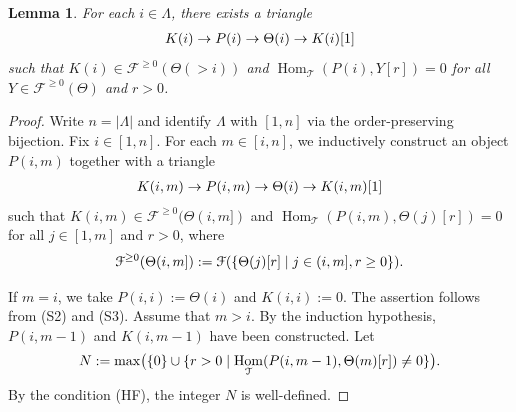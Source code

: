 \documentclass[a4paper,reqno,11pt]{amsart}
\numberwithin{equation}{section}
\newtheorem{lemma}[theorem]{Lemma}
\theoremstyle{definition}
\newcommand{\F}{\mathcal{F}}
\newcommand{\T}{\mathcal{T}}
\newcommand{\bte}{\Theta}
\DeclareMathOperator{\Hom}{Hom}
\begin{document}
\begin{lemma}\label{lem:DR_stand}
For each $i\in\Lambda$, there exists a triangle
\begin{align}
K(i)\to P(i)\to \bte(i)\to K(i)[1]\notag
\end{align}
such that $K(i)\in\F^{\geq 0}(\bte(>i))$ and $\Hom_{\T}(P(i),Y[r])=0$ for all $Y\in\F^{\geq 0}(\bte)$ and $r>0$.
\end{lemma}
\begin{proof}
Write $n=|\Lambda|$ and identify $\Lambda$ with $[1,n]$ via the order-preserving bijection.
Fix $i\in[1,n]$.
For each $m\in[i,n]$, we inductively construct an object $P(i,m)$ together with a triangle
\begin{align}
K(i,m)\to P(i,m)\to\bte(i)\to K(i,m)[1]\notag
\end{align}
such that $K(i,m)\in\F^{\geq 0}(\bte(i,m])$ and $\Hom_{\T}(P(i,m),\bte(j)[r])=0$ for all $j\in[1,m]$ and $r>0$, where
\begin{align}
\F^{\geq 0}(\bte(i,m]):= \F(\{\bte(j)[r]\mid j\in (i,m],r\geq 0\}).\notag
\end{align}

If $m=i$, we take $P(i,i):=\bte(i)$ and $K(i,i):=0$. The assertion follows from (S2) and (S3).
Assume that $m>i$. By the induction hypothesis, $P(i,m-1)$ and $K(i,m-1)$ have been constructed.
Let
\begin{align}
N:=\max\bigl( \{0\}\cup \{r>0\mid\Hom_{\T}(P(i,m-1),\bte(m)[r])\neq 0\} \bigr).\notag
\end{align}
By the condition (HF), the integer $N$ is well-defined.


\end{proof}
\end{document}
